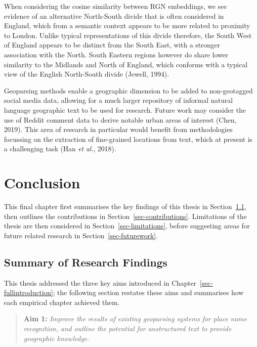 \documentclass[
  letterpaper,
  11pt,
  english,
  onehalfspacing,
  headsepline]{MastersDoctoralThesis}
\begin{document}
When considering the cosine similarity between RGN embeddings, we see
evidence of an alternative North-South divide that is often considered
in England, which from a semantic context appears to be more related to
proximity to London. Unlike typical representations of this divide
therefore, the South West of England appears to be distinct from the
South East, with a stronger association with the North. South Eastern
regions however do share lower similarity to the Midlands and North of
England, which conforms with a typical view of the English North-South
divide (Jewell, 1994).

Geoparsing methods enable a geographic dimension to be added to
non-geotagged social media data, allowing for a much larger repository
of informal natural language geographic text to be used for research.
Future work may consider the use of Reddit comment data to derive
notable urban areas of interest (Chen, 2019). This area of research in
particular would benefit from methodologies focussing on the extraction
of fine-grained locations from text, which at present is a challenging
task (Han \emph{et al.}, 2018).


\hypertarget{sec-conclusion}{%
\chapter{Conclusion}\label{sec-conclusion}}

This final chapter first summarises the key findings of this thesis in
Section~\ref{sec-summary}, then outlines the contributions in
Section~\ref{sec-contributions}. Limitations of the thesis are then
considered in Section~\ref{sec-limitations}, before suggesting areas for
future related research in Section~\ref{sec-futurework}.

\hypertarget{sec-summary}{%
\section{Summary of Research Findings}\label{sec-summary}}

This thesis addressed the three key aims introduced in
Chapter~\ref{sec-fullintroduction}; the following section restates these
aims and summarises how each empirical chapter achieved them.

\begin{quote}
\textbf{Aim 1:} \emph{Improve the results of existing geoparsing systems
for place name recognition, and outline the potential for unstructured
text to provide geographic knowledge.}
\end{quote}
\end{document}
